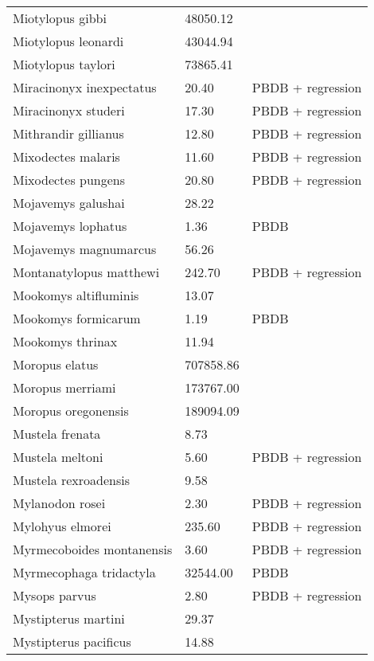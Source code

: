 \documentclass{article}
\begin{document}
\begin{center}
\begin{longtable}{p{} p{} p{}}
    Miotylopus gibbi & 48050.12 & \cite{Tomiya2013} \\ 
    Miotylopus leonardi & 43044.94 & \cite{Tomiya2013} \\ 
    Miotylopus taylori & 73865.41 & \cite{Tomiya2013} \\ 
    Miracinonyx inexpectatus & 20.40 & PBDB + regression \\ 
    Miracinonyx studeri & 17.30 & PBDB + regression \\ 
    Mithrandir gillianus & 12.80 & PBDB + regression \\ 
    Mixodectes malaris & 11.60 & PBDB + regression \\ 
    Mixodectes pungens & 20.80 & PBDB + regression \\ 
    Mojavemys galushai & 28.22 & \cite{Tomiya2013} \\ 
    Mojavemys lophatus & 1.36 & PBDB \\ 
    Mojavemys magnumarcus & 56.26 & \cite{Tomiya2013} \\ 
    Montanatylopus matthewi & 242.70 & PBDB + regression \\ 
    Mookomys altifluminis & 13.07 & \cite{Tomiya2013} \\ 
    Mookomys formicarum & 1.19 & PBDB \\ 
    Mookomys thrinax & 11.94 & \cite{Tomiya2013} \\ 
    Moropus elatus & 707858.86 & \cite{Tomiya2013} \\ 
    Moropus merriami & 173767.00 & \cite{McKenna2011} \\ 
    Moropus oregonensis & 189094.09 & \cite{Tomiya2013} \\ 
    Mustela frenata & 8.73 & \cite{Smith2004} \\ 
    Mustela meltoni & 5.60 & PBDB + regression \\ 
    Mustela rexroadensis & 9.58 & \cite{Tomiya2013} \\ 
    Mylanodon rosei & 2.30 & PBDB + regression \\ 
    Mylohyus elmorei & 235.60 & PBDB + regression \\ 
    Myrmecoboides montanensis & 3.60 & PBDB + regression \\ 
    Myrmecophaga tridactyla & 32544.00 & PBDB \\ 
    Mysops parvus & 2.80 & PBDB + regression \\ 
    Mystipterus martini & 29.37 & \cite{Tomiya2013} \\ 
    Mystipterus pacificus & 14.88 & \cite{Tomiya2013} \\ 

\end{longtable}
\end{center}
\end{document}
